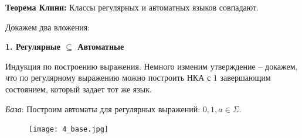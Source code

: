 \hspace{4ex}

\textbf{Теорема Клини:} Классы регулярных и автоматных языков совпадают.

\Proof Докажем два вложения:

\textbf{1. Регулярные $\subseteq$ Автоматные}

    
    



Индукция по построению выражения. Немного изменим утверждение -- докажем, что по регулярному выражению можно построить НКА с $1$ завершающим состоянием, который задает тот же язык.

\textit{База}: Построим автоматы для регулярных выражений: $0, 1, a \in \Sigma$.
\begin{figure}[h!]
    \centering
    \texttt{[image: 4\_base.jpg]}
\end{figure}

